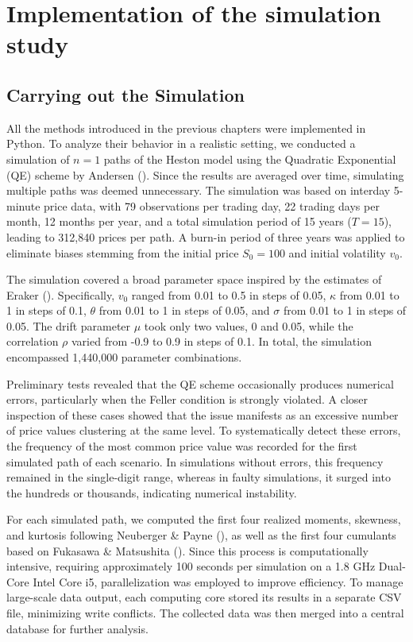\chapter{Implementation of the simulation study}
\label{sec:methodical_approach}

\section{Carrying out the Simulation}
All the methods introduced in the previous chapters were implemented in Python. To analyze their behavior in a realistic setting, we conducted a simulation of $n = 1$ paths of the Heston model using the Quadratic Exponential (QE) scheme by Andersen (\citeyear{andersenEfficientSimulationHeston2007}). Since the results are averaged over time, simulating multiple paths was deemed unnecessary. The simulation was based on interday 5-minute price data, with 79 observations per trading day, 22 trading days per month, 12 months per year, and a total simulation period of 15 years ($T = 15$), leading to 312,840 prices per path. A burn-in period of three years was applied to eliminate biases stemming from the initial price $S_0 = 100$ and initial volatility $v_0$.

The simulation covered a broad parameter space inspired by the estimates of Eraker (\citeyear{erakerStockPricesVolatility2004}). Specifically, $v_0$ ranged from 0.01 to 0.5 in steps of 0.05, $\kappa$ from 0.01 to 1 in steps of 0.1, $\theta$ from 0.01 to 1 in steps of 0.05, and $\sigma$ from 0.01 to 1 in steps of 0.05. The drift parameter $\mu$ took only two values, 0 and 0.05, while the correlation $\rho$ varied from -0.9 to 0.9 in steps of 0.1. In total, the simulation encompassed 1,440,000 parameter combinations.

Preliminary tests revealed that the QE scheme occasionally produces numerical errors, particularly when the Feller condition is strongly violated. A closer inspection of these cases showed that the issue manifests as an excessive number of price values clustering at the same level. To systematically detect these errors, the frequency of the most common price value was recorded for the first simulated path of each scenario. In simulations without errors, this frequency remained in the single-digit range, whereas in faulty simulations, it surged into the hundreds or thousands, indicating numerical instability.

For each simulated path, we computed the first four realized moments, skewness, and kurtosis following Neuberger \& Payne (\citeyear{neubergerSkewnessStockMarket2021}), as well as the first four cumulants based on Fukasawa \& Matsushita (\citeyear{fukasawaRealizedCumulantsMartingales2021}). Since this process is computationally intensive, requiring approximately 100 seconds per simulation on a 1.8 GHz Dual-Core Intel Core i5, parallelization was employed to improve efficiency. To manage large-scale data output, each computing core stored its results in a separate CSV file, minimizing write conflicts. The collected data was then merged into a central database for further analysis.

